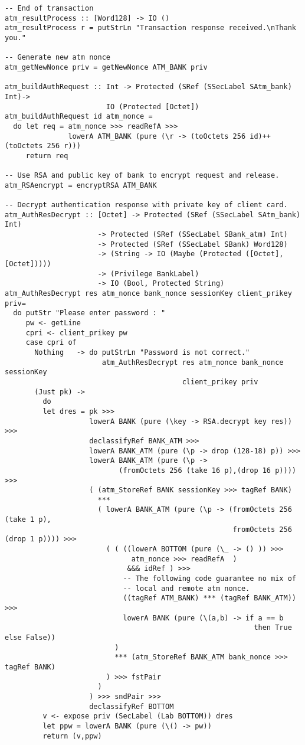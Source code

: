 \begin{Verbatim}[fontsize=\footnotesize,frame=lines,
                 framesep=5mm, label={[BankSystem.hs]BankSystem.hs}]
-- End of transaction
atm_resultProcess :: [Word128] -> IO ()
atm_resultProcess r = putStrLn "Transaction response received.\nThank you."

-- Generate new atm nonce
atm_getNewNonce priv = getNewNonce ATM_BANK priv

atm_buildAuthRequest :: Int -> Protected (SRef (SSecLabel SAtm_bank) Int)-> 
                        IO (Protected [Octet])
atm_buildAuthRequest id atm_nonce =
  do let req = atm_nonce >>> readRefA >>> 
               lowerA ATM_BANK (pure (\r -> (toOctets 256 id)++(toOctets 256 r)))
     return req

-- Use RSA and public key of bank to encrypt request and release.
atm_RSAencrypt = encryptRSA ATM_BANK

-- Decrypt authentication response with private key of client card.
atm_AuthResDecrypt :: [Octet] -> Protected (SRef (SSecLabel SAtm_bank) Int) 
                      -> Protected (SRef (SSecLabel SBank_atm) Int) 
                      -> Protected (SRef (SSecLabel SBank) Word128) 
                      -> (String -> IO (Maybe (Protected ([Octet],[Octet]))))
                      -> (Privilege BankLabel)
                      -> IO (Bool, Protected String) 
atm_AuthResDecrypt res atm_nonce bank_nonce sessionKey client_prikey priv=
  do putStr "Please enter password : "
     pw <- getLine
     cpri <- client_prikey pw
     case cpri of 
       Nothing   -> do putStrLn "Password is not correct."
                       atm_AuthResDecrypt res atm_nonce bank_nonce sessionKey 
                                          client_prikey priv
       (Just pk) -> 
         do
         let dres = pk >>> 
                    lowerA BANK (pure (\key -> RSA.decrypt key res)) >>>
                    declassifyRef BANK_ATM >>>
                    lowerA BANK_ATM (pure (\p -> drop (128-18) p)) >>>
                    lowerA BANK_ATM (pure (\p -> 
                           (fromOctets 256 (take 16 p),(drop 16 p)))) >>>
                    ( (atm_StoreRef BANK sessionKey >>> tagRef BANK) 
                      *** 
                      ( lowerA BANK_ATM (pure (\p -> (fromOctets 256 (take 1 p), 
                                                      fromOctets 256 (drop 1 p)))) >>>
                        ( ( ((lowerA BOTTOM (pure (\_ -> () )) >>>
                              atm_nonce >>> readRefA  )
                             &&& idRef ) >>>
                            -- The following code guarantee no mix of 
                            -- local and remote atm nonce.
                            ((tagRef ATM_BANK) *** (tagRef BANK_ATM)) >>> 
                            lowerA BANK (pure (\(a,b) -> if a == b 
                                                           then True else False))
                          )
                          *** (atm_StoreRef BANK_ATM bank_nonce >>> tagRef BANK)
                        ) >>> fstPair
                      )
                    ) >>> sndPair >>> 
                    declassifyRef BOTTOM
         v <- expose priv (SecLabel (Lab BOTTOM)) dres 
         let ppw = lowerA BANK (pure (\() -> pw))
         return (v,ppw)
                               

\end{Verbatim}
